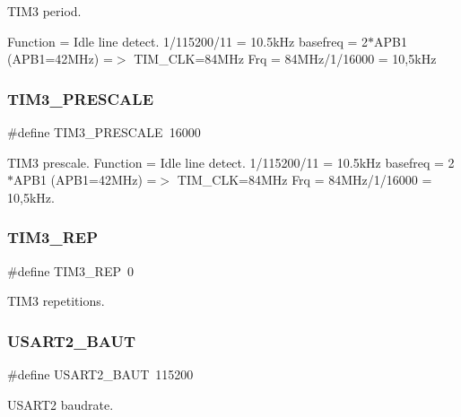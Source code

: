 T\+I\+M3 period. 

Function = Idle line detect. 1/115200/11 = 10.\+5k\+Hz basefreq = 2$\ast$\+A\+P\+B1 (A\+P\+B1=42\+M\+Hz) =$>$ T\+I\+M\+\_\+\+C\+LK=84\+M\+Hz Frq = 84\+M\+Hz/1/16000 = 10,5k\+Hz \mbox{\label{group___u_a_r_t_ga8a8bca812ed15b484d996bd1ae2fe2b0}} 
\subsubsection{\texorpdfstring{T\+I\+M3\+\_\+\+P\+R\+E\+S\+C\+A\+LE}{TIM3\_PRESCALE}}
{\footnotesize\ttfamily \#define T\+I\+M3\+\_\+\+P\+R\+E\+S\+C\+A\+LE~16000}



T\+I\+M3 prescale. Function = Idle line detect. 1/115200/11 = 10.\+5k\+Hz basefreq = 2$\ast$\+A\+P\+B1 (A\+P\+B1=42\+M\+Hz) =$>$ T\+I\+M\+\_\+\+C\+LK=84\+M\+Hz Frq = 84\+M\+Hz/1/16000 = 10,5k\+Hz. 

\mbox{\label{group___u_a_r_t_ga532c634753a005c2474ea535f4374c0d}} 
\subsubsection{\texorpdfstring{T\+I\+M3\+\_\+\+R\+EP}{TIM3\_REP}}
{\footnotesize\ttfamily \#define T\+I\+M3\+\_\+\+R\+EP~0}



T\+I\+M3 repetitions. 

\mbox{\label{group___u_a_r_t_ga4155a38b0821ffbb7621dfb91213dcd0}} 
\subsubsection{\texorpdfstring{U\+S\+A\+R\+T2\+\_\+\+B\+A\+UT}{USART2\_BAUT}}
{\footnotesize\ttfamily \#define U\+S\+A\+R\+T2\+\_\+\+B\+A\+UT~115200}



U\+S\+A\+R\+T2 baudrate. 

